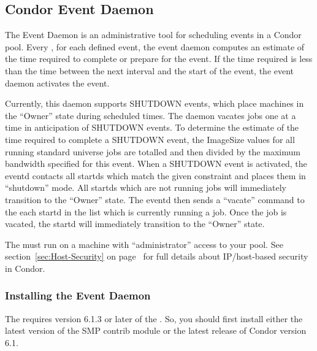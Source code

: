 \subsection{\label{sec:EventD}
Condor Event Daemon}

The Event Daemon is an administrative tool for scheduling events in a
Condor pool.
Every , for each defined event, the event
daemon computes an estimate of the time required to complete or
prepare for the event.  If the time required is less than the time
between the next interval and the start of the event, the event daemon
activates the event.

Currently, this daemon supports SHUTDOWN events, which place machines
in the ``Owner'' state during scheduled times.
The daemon vacates jobs one at a time in anticipation of SHUTDOWN
events.
To determine the estimate of the time required to complete a SHUTDOWN
event, the ImageSize values for all running standard universe jobs are
totalled and then divided by the maximum bandwidth specified for this
event.
When a SHUTDOWN event is activated, the eventd contacts all startds
which match the given constraint and places them in ``shutdown'' mode.
All startds which are not running jobs will immediately transition to
the ``Owner'' state.
The eventd then sends a ``vacate'' command to the each startd in
the list which is currently running a job.
Once the job is vacated, the startd will immediately transition to the
``Owner'' state.

The  must run on a machine with ``administrator''
access to your pool.
See section~\ref{sec:Host-Security} on
page~\pageref{sec:Host-Security} for full details about IP/host-based
security in Condor.

\subsubsection{\label{sec:EventD-Installation}
Installing the Event Daemon} 

The  requires version 6.1.3 or later of the
.
So, you should first install either the latest version of the SMP
 contrib module or the latest release of Condor version
6.1.

